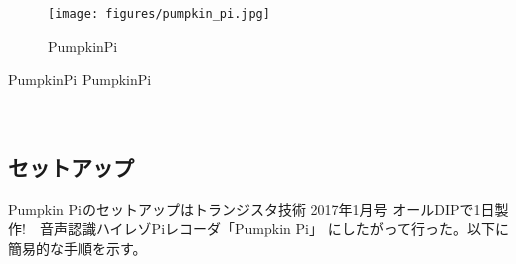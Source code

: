 \begin{figure}[H]
\centering
\texttt{[image: figures/pumpkin\_pi.jpg]}
\caption{PumpkinPi}
\end{figure}

\cite{http://select.marutsu.co.jp/list/detail.php?id=258}{PumpkinPi}
\cite{https://www.marutsu.co.jp/pc/i/833515/}{PumpkinPi}

\
\subsection{セットアップ}\label{adc-setup}

Pumpkin
Piのセットアップは\cite{https://toragi.cqpub.co.jp/tabid/829/Default.aspx}{トランジスタ技術
2017年1月号 オールDIPで1日製作!　音声認識ハイレゾPiレコーダ「Pumpkin
Pi」} にしたがって行った。以下に簡易的な手順を示す。

